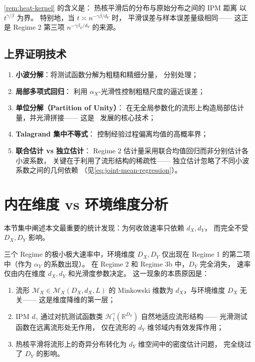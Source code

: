 \cref{rem:heat-kernel} 的含义是：
热核平滑后的分布与原始分布之间的 IPM 距离
以 $t^{\gamma/\beta}$ 为界。
特别地，当 $t \asymp n^{-\gamma\beta/d_Y}$ 时，
平滑误差与样本误差量级相同——
这正是 Regime 2 第三项 $n^{-\gamma\beta_Y/d_Y}$ 的来源。

\subsection{上界证明技术}\label{sec:ch2-upper-bound-techniques}

\begin{enumerate}
    \item \textbf{小波分解}：将测试函数分解为粗糙和精细分量，
          分别处理；
    \item \textbf{局部多项式回归}：
          利用 $\alpha_X$-光滑性控制粗糙尺度的逼近误差；
    \item \textbf{单位分解（Partition of Unity）}：
          在无全局参数化的流形上构造局部估计量，并光滑拼接——
          这是~\citep{tang2022minimax} 发展的核心技术；
    \item \textbf{Talagrand 集中不等式}：
          控制经验过程偏离均值的高概率界；
    \item \textbf{联合估计 vs 独立估计}：
          Regime 2 估计量采用联合均值回归而非分别估计各小波系数，
          关键在于利用了流形结构的稀疏性——
          独立估计忽略了不同小波系数之间的几何依赖
          （见\cref{eq:joint-mean-regression}）。
\end{enumerate}

\section{内在维度 vs 环境维度分析}\label{sec:ch2-dim-analysis}

本节集中阐述本文最重要的统计发现：为何收敛速率只依赖 $d_X, d_Y$，
而完全不受 $D_X, D_Y$ 影响。

\begin{Remark}\label{rem:intrinsic-vs-environmental}
    三个 Regime 的极小极大速率中，环境维度 $D_X, D_Y$
    仅出现在 Regime 1 的第二项中（作为 $\alpha_Y$ 的系数出现）。
    在 Regime 2 和 Regime 3b 中，$D_Y$ 完全消失，
    速率仅由内在维度 $d_X, d_Y$ 和光滑度参数决定。
    这一现象的本质原因是：
    \begin{enumerate}
        \item 流形 $\mathcal{M}_X \in \mathcal{M}_X(D_X, d_X, L)$
              的 Minkowski 维数为 $d_X$，与环境维度 $D_X$ 无关——
              这是维度降维的第一层；
        \item IPM $d_\gamma$ 通过对抗测试函数类
              $\mathcal{H}_1^\gamma(\mathbb{R}^{D_Y})$
              自然地适应流形结构——
              光滑测试函数在远离流形处无作用，
              仅在流形的 $d_Y$ 维邻域内有效发挥作用；
        \item 热核平滑将流形上的奇异分布转化为
              $d_Y$ 维空间中的密度估计问题，
              完全绕过了 $D_Y$ 的影响。
    \end{enumerate}
\end{Remark}


